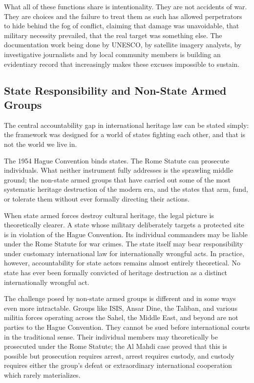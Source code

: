 What all of these functions share is intentionality. They are not accidents of war. They are choices  and the failure to treat them as such has allowed perpetrators to hide behind the fog of conflict, claiming that damage was unavoidable, that military necessity prevailed, that the real target was something else. The documentation work being done by UNESCO, by satellite imagery analysts, by investigative journalists and by local community members is building an evidentiary record that increasingly makes these excuses impossible to sustain.

\subsection{State Responsibility and Non-State Armed Groups}

The central accountability gap in international heritage law can be stated simply: the framework was designed for a world of states fighting each other, and that is not the world we live in.

The 1954 Hague Convention binds states. The Rome Statute can prosecute individuals. What neither instrument fully addresses is the sprawling middle ground; the non-state armed groups that have carried out some of the most systematic heritage destruction of the modern era, and the states that arm, fund, or tolerate them without ever formally directing their actions.

When state armed forces destroy cultural heritage, the legal picture is theoretically clearer. A state whose military deliberately targets a protected site is in violation of the Hague Convention. Its individual commanders may be liable under the Rome Statute for war crimes. The state itself may bear responsibility under customary international law for internationally wrongful acts. In practice, however, accountability for state actors remains almost entirely theoretical. No state has ever been formally convicted of heritage destruction as a distinct internationally wrongful act.

The challenge posed by non-state armed groups is different and in some ways even more intractable. Groups like ISIS, Ansar Dine, the Taliban, and various militia forces operating across the Sahel, the Middle East, and beyond are not parties to the Hague Convention. They cannot be sued before international courts in the traditional sense. Their individual members may theoretically be prosecuted under the Rome Statute; the Al Mahdi case proved that this is possible but prosecution requires arrest, arrest requires custody, and custody requires either the group's defeat or extraordinary international cooperation which rarely materializes.


